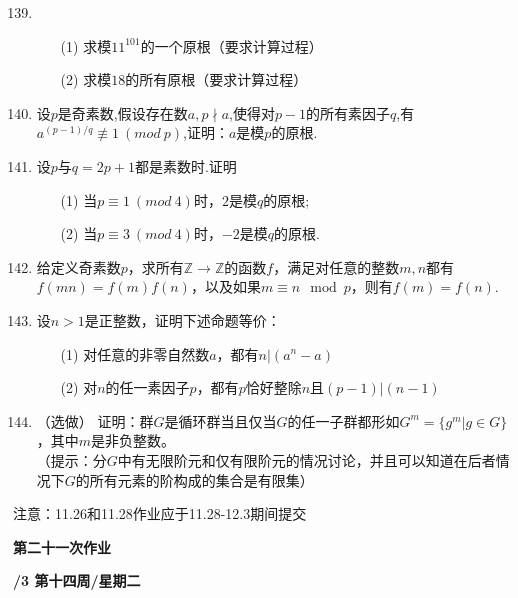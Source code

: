 \documentclass[a4paper,12pt]{article}
\begin{document}
\begin{enumerate}\setcounter{enumi}{138}
 \item \begin{itemize}
     \item[(1)] 求模$11^{101}$的一个原根（要求计算过程）
     \item[(2)] 求模$18$的所有原根（要求计算过程）
 \end{itemize}
 \item 设$p$是奇素数,假设存在数$a,p\nmid a$,使得对$p-1$的所有素因子$q$,有$a^{(p-1)/q}\not\equiv 1\ (mod\ p)$,证明：$a$是模$p$的原根.
 \item 设$p$与$q=2p+1$都是素数时.证明
 \begin{itemize}
 \item[(1)] 当$p\equiv1\ (mod\ 4)$时，$2$是模$q$的原根;
 \item[(2)] 当$p\equiv3\ (mod\ 4)$时，$-2$是模$q$的原根.
 \end{itemize}

 \item 给定义奇素数$p$，求所有$\mathbb{Z}\rightarrow \mathbb{Z}$的函数$f$，满足对任意的整数$m,n$都有$f(mn)=f(m)f(n)$，以及如果$m\equiv n \mod p$，则有$f(m)=f(n)$.

 \item 设$n>1$是正整数，证明下述命题等价：\begin{itemize}
     \item[(1)] 对任意的非零自然数$a$，都有$n|(a^n-a)$
     \item[(2)] 对$n$的任一素因子$p$，都有$p$恰好整除$n$且$(p-1)|(n-1)$ 
 \end{itemize}

 \item（{\color{red}选做}） 证明：群$G$是循环群当且仅当$G$的任一子群都形如$G^m=\{g^m|g\in G\}$，其中$m$是非负整数。\\（提示：分$G$中有无限阶元和仅有限阶元的情况讨论，并且可以知道在后者情况下$G$的所有元素的阶构成的集合是有限集）
\end{enumerate}

{\color{red} 注意：11.26和11.28作业应于11.28-12.3期间提交}


\newpage
\head

\begin{center} %
	{\Large \bf 第二十一次作业} %
	\vspace{2mm}
	
	{\bf{}/3 \quad  第十四周/星期二} %
\end{center} 
\end{document}
